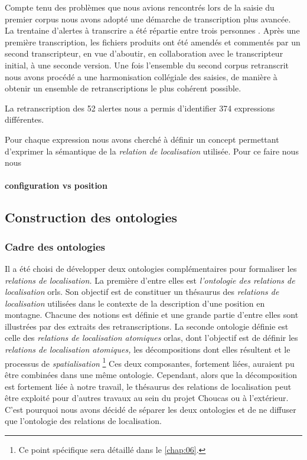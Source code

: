 Compte tenu des problèmes que nous avions rencontrés lors de la saisie
du premier corpus nous avons adopté une démarche de transcription plus
avancée. La trentaine d'alertes à transcrire a été répartie entre
trois  personnes \autocite{Bunel2019}. Après une première
transcription, les fichiers produits ont été amendés et commentés par
un second transcripteur, en vue d'aboutir, en collaboration avec le
transcripteur initial, à une seconde version. Une fois l'ensemble du
second corpus retranscrit nous avons procédé a une harmonisation
collégiale des saisies, de manière à obtenir un ensemble de
retranscriptions le plus cohérent possible.

La retranscription des 52 alertes nous a permis d'identifier 374
expressions différentes. 

Pour chaque expression nous avons cherché à définir un concept
permettant d'exprimer la sémantique de la \emph{relation de
  localisation} utilisée. Pour ce faire nous nous 





\paragraph{configuration vs position}



\subsection{Construction des ontologies}

\subsubsection{Cadre des ontologies}

Il a été choisi de développer deux ontologies complémentaires pour
formaliser les \emph{relations de localisation.} La première d'entre
elles est \emph{l'ontologie des relations de localisation}
\acp{orl}. Son objectif est de constituer un thésaurus des
\emph{relations de localisation} utilisées dans le contexte de la
description d'une position en montagne. Chacune des notions est
définie et une grande partie d'entre elles sont illustrées par des
extraits des retranscriptions. La seconde ontologie définie est celle
des \emph{relations de localisation atomiques} \acp{orla}, dont
l'objectif est de définir les \emph{relations de localisation
  atomiques,} les décompositions dont elles résultent et le processus
de \emph{spatialisation} \footnote{Ce point spécifique sera détaillé
  dans le \autoref{chap:06}.} Ces deux composantes, fortement liées,
auraient pu être combinées dans une même ontologie. Cependant, alors
que la décomposition est fortement liée à notre travail, le thésaurus
des relations de localisation peut être exploité pour d'autres travaux
au sein du projet Choucas ou à l'extérieur. C'est pourquoi nous avons
décidé de séparer les deux ontologies et de ne diffuser que
l'ontologie des relations de localisation.

